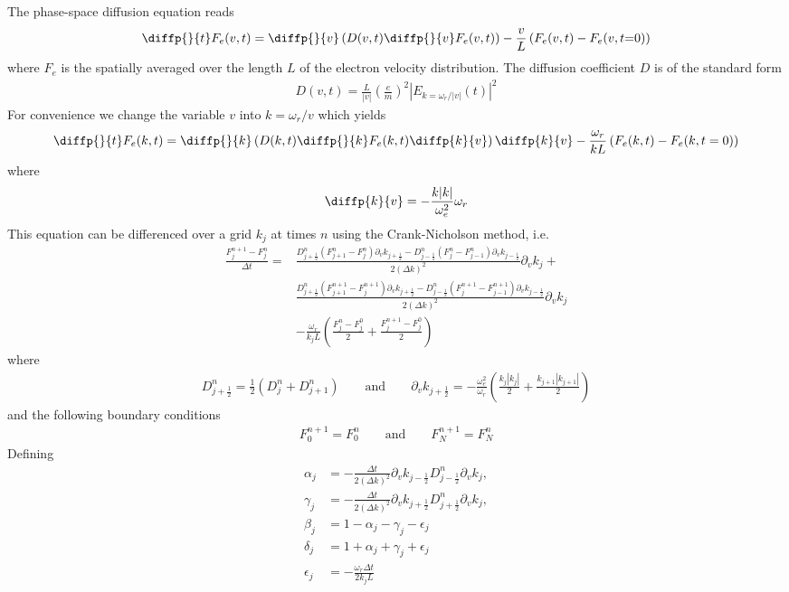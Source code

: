 \documentclass[10pt,a4paper]{article}
\begin{document}
The phase-space diffusion equation reads
\citep{sanbonmatsu:2000b,sanbonmatsu:2001}
\begin{align}
\diffp{}{t}F_e(v,t) = \diffp{}{v}\left(D(v,t)\diffp{}{v}F_e(v,t)\right)
-\frac{v}{L}\left(F_e(v,t)-F_e(v,t{=}0)\right)
\end{align}
where $F_e$ is the spatially averaged over the length $L$ of the 
electron velocity distribution. 
The diffusion coefficient $D$  is of the standard form 
\begin{align}
D(v,t) = \frac{L}{|v|}\left(\frac{e}{m}\right)^2\left|E_{k=\omega_r/|v|}(t)\right|^2
\end{align}
For convenience we change the variable $v$ into $k=\omega_r/v$ which yields
\begin{align}
\diffp{}{t}F_e(k,t) = \diffp{}{k}\left(
D(k,t)\diffp{}{k}F_e(k,t)\diffp{k}{v}\right)\diffp{k}{v}
-\frac{\omega_r}{kL}\left(F_e(k,t)-F_e(k,t=0)\right)
\end{align}
where 
\begin{align}
\diffp{k}{v}=-\frac{k|k|}{\omega_e^2}\omega_r
\end{align}
This equation can be differenced over a grid $k_j$ at times $n$
using the Crank-Nicholson method,  i.e.
\begin{align}
\frac{F_j^{n+1}-F_j^n}{\Delta t}  = & 
\frac{D_{j{+}\frac{1}{2}}^n\left(F_{j+1}^n-F_j^n\right)
\partial_vk_{j{+}\frac{1}{2}}-
D_{j{-}\frac{1}{2}}^n\left(F_j^n-F_{j-1}^n\right)\partial_vk_{j{-}\frac{1}{2}}}
{2(\Delta k)^2}\partial_vk_j+\\
& \frac{D_{j{+}\frac{1}{2}}^n\left(F_{j+1}^{n+1}-F_j^{n+1}\right)
\partial_vk_{j{+}\frac{1}{2}}-
D_{j{-}\frac{1}{2}}^n\left(F_j^{n+1}-F_{j-1}^{n+1}\right)
\partial_vk_{j{-}\frac{1}{2}}}{2(\Delta k)^2}\partial_vk_j\\
& -\frac{\omega_r}{k_jL}\left(\frac{F_j^n-F_j^0}{2}+\frac{F_j^{n+1}-F_j^0}{2}\right)
\end{align}
where
\begin{align}
D_{j{+}\frac{1}{2}}^n = \frac{1}{2}\left(D_j^n+D_{j+1}^n\right) 
\qquad\text{and}\qquad
\partial_vk_{j{+}\frac{1}{2}} = -\frac{\omega_e^2}{\omega_r}
\left(\frac{k_j|k_j|}{2}+\frac{k_{j{+}1}|k_{j{+}1}|}{2}\right)
\end{align}
and the following boundary conditions
\begin{align}
F_0^{n+1}=F_0^n  \qquad\text{and}\qquad 
F_N^{n+1}=F_N^n 
\end{align}
Defining 
\begin{align}
\alpha_j & = -\frac{\Delta t}{2(\Delta k)^2}\partial_vk_{j{-}\frac{1}{2}}D_{j{-}\frac{1}{2}}^n
\partial_vk_j,\\
\gamma_j & = -\frac{\Delta t}{2(\Delta k)^2}\partial_vk_{j{+}\frac{1}{2}}D_{j{+}\frac{1}{2}}^n
\partial_vk_j,\\
\beta_j & = 1 -\alpha_j-\gamma_j-\epsilon_j\\
\delta_j & = 1 +\alpha_j+\gamma_j+\epsilon_j\\
\epsilon_j & = -\frac{\omega_r\Delta t}{2k_jL}
\end{align}
\end{document}
